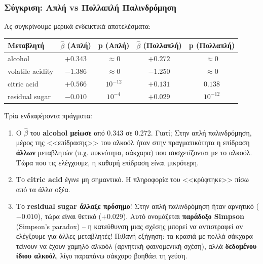 \documentclass[12pt,a4paper]{article}
\begin{document}
\subsubsection{Σύγκριση: Απλή vs Πολλαπλή Παλινδρόμηση}

\begin{theorybox}
Ας συγκρίνουμε μερικά ενδεικτικά αποτελέσματα:

\begin{center}
\small
\begin{tabular}{lcccc}
\toprule
\textbf{Μεταβλητή} & $\hat{\beta}$ \textbf{(Απλή)} & \textbf{p (Απλή)} & $\hat{\beta}$ \textbf{(Πολλαπλή)} & \textbf{p (Πολλαπλή)} \\
\midrule
alcohol & $+0.343$ & $\approx 0$ & $+0.272$ & $\approx 0$ \\
volatile acidity & $-1.386$ & $\approx 0$ & $-1.250$ & $\approx 0$ \\
citric acid & $+0.566$ & $10^{-12}$ & $+0.131$ & $0.138$ \\
residual sugar & $-0.010$ & $10^{-4}$ & $+0.029$ & $10^{-12}$ \\
\bottomrule
\end{tabular}
\end{center}

Τρία ενδιαφέροντα πράγματα:
\begin{enumerate}
    \item Ο $\hat{\beta}$ του \textbf{alcohol μείωσε} από 0.343 σε 0.272. Γιατί; Στην απλή παλινδρόμηση, μέρος της <<επίδρασης>> του αλκοόλ ήταν στην πραγματικότητα η επίδραση \textbf{άλλων} μεταβλητών (π.χ. πυκνότητα, σάκχαρα) που συσχετίζονται με το αλκοόλ. Τώρα που τις ελέγχουμε, η καθαρή επίδραση είναι μικρότερη.

    \item Το \textbf{citric acid} έγινε μη σημαντικό. Η πληροφορία του <<κρύφτηκε>> πίσω από τα άλλα οξέα.

    \item Το \textbf{residual sugar άλλαξε πρόσημο}! Στην απλή παλινδρόμηση ήταν αρνητικό ($-0.010$), τώρα είναι θετικό ($+0.029$). Αυτό ονομάζεται \textbf{παράδοξο Simpson} (Simpson's paradox) -- η κατεύθυνση μιας σχέσης μπορεί να αντιστραφεί αν ελέγξουμε για άλλες μεταβλητές! Πιθανή εξήγηση: τα κρασιά με πολλά σάκχαρα τείνουν να έχουν χαμηλό αλκοόλ (αρνητική φαινομενική σχέση), αλλά \textbf{δεδομένου ίδιου αλκοόλ}, λίγο παραπάνω σάκχαρο βοηθάει τη γεύση.
\end{enumerate}
\end{theorybox}
\end{document}
